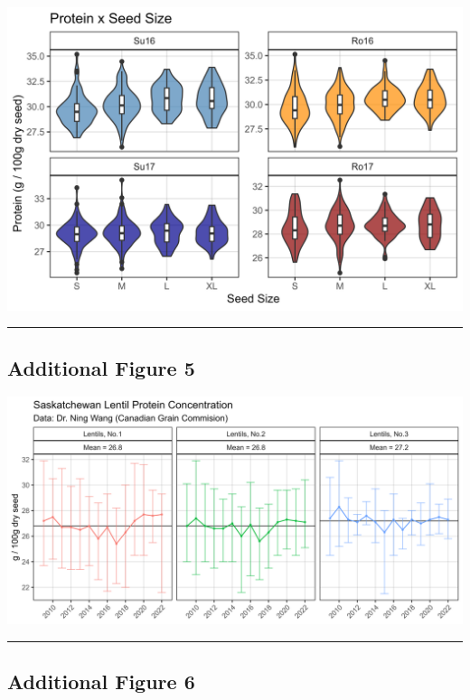 \documentclass[
]{article}
\begin{document}
\includegraphics{Additional/Additional_Figure_04.jpg}

\begin{center}\rule{0.5\linewidth}{0.5pt}\end{center}

\hypertarget{additional-figure-5}{%
\subsection{Additional Figure 5}\label{additional-figure-5}}

\includegraphics{Additional/Additional_Figure_05.jpg}

\begin{center}\rule{0.5\linewidth}{0.5pt}\end{center}

\hypertarget{additional-figure-6}{%
\subsection{Additional Figure 6}\label{additional-figure-6}}
\end{document}
